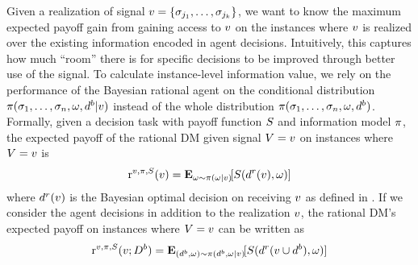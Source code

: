 Given a realization of signal $v = \{\sigma_{j_1}, \ldots, \sigma_{j_k}\}$, we want to know the maximum expected payoff gain from gaining access to $v$ on the instances where $v$ is realized over the existing information encoded in agent decisions. Intuitively, this captures how much ``room'' there is for specific decisions to be improved through better use of the signal.
To calculate instance-level information value, we rely on the performance of the Bayesian rational agent on the conditional distribution $\pi(\sigma_1, \ldots, \sigma_n, \omega, d^b | v)$ instead of the whole distribution $\pi(\sigma_1, \ldots, \sigma_n, \omega, d^b)$.
Formally, given a decision task with payoff function $S$ and information model $\pi$, the expected payoff of the rational DM given signal $V = v$ on instances where $V = v$ is
\begin{equation}
\mathrm{r}^{\sigval, \dgp, \score}(\sigval) = \expect[\payoffstatevalue \sim \dgp(\payoffstatevalue | \sigval)]{\score(\action^r(\sigval), \payoffstatevalue)}
\end{equation}
\noindent where $d^r(v)$ is the Bayesian optimal decision on receiving  $v$ as defined in .
If we consider the agent decisions in addition to the realization $v$, the rational DM's expected payoff on instances where $V = v$ can be written as
\begin{equation}
\mathrm{r}^{\sigval, \dgp, \score}(\sigval; \actionvar^b) = \expect[(\action^b, \payoffstatevalue) \sim \dgp(\action^b, \payoffstatevalue | \sigval)]{\score(\action^r(\sigval \cup \action^b), \payoffstatevalue)}
\end{equation}

